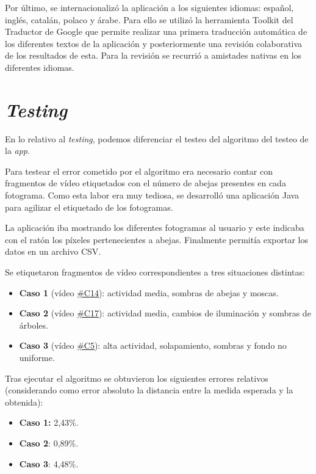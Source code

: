 Por último, se internacionalizó la aplicación a los siguientes idiomas:
español, inglés, catalán, polaco y árabe. Para ello se utilizó la
herramienta Toolkit del Traductor de Google que permite realizar una
primera traducción automática de los diferentes textos de la aplicación
y posteriormente una revisión colaborativa de los resultados de esta.
Para la revisión se recurrió a amistades nativas en los diferentes
idiomas.

\section{\emph{Testing}}\label{testing}

En lo relativo al \emph{testing}, podemos diferenciar el testeo del
algoritmo del testeo de la \emph{app}.

Para testear el error cometido por el algoritmo era necesario contar con
fragmentos de vídeo etiquetados con el número de abejas presentes en
cada fotograma. Como esta labor era muy tediosa, se desarrolló una
aplicación Java para agilizar el etiquetado de los fotogramas.

La aplicación iba mostrando los diferentes fotogramas al usuario y este
indicaba con el ratón los píxeles pertenecientes a abejas. Finalmente
permitía exportar los datos en un archivo CSV.


Se etiquetaron fragmentos de vídeo correspondientes a tres situaciones
distintas:

\begin{itemize}
\tightlist
\item
  \textbf{Caso 1} (vídeo \href{https://youtu.be/9pkPCnS2aRY}{\#C14}):
  actividad media, sombras de abejas y moscas.
\item
  \textbf{Caso 2} (vídeo \href{https://youtu.be/ENocXS3cEP0}{\#C17}):
  actividad media, cambios de iluminación y sombras de árboles.
\item
  \textbf{Caso 3} (vídeo \href{https://youtu.be/YjGX4mC7pO4}{\#C5}):
  alta actividad, solapamiento, sombras y fondo no uniforme.
\end{itemize}

Tras ejecutar el algoritmo se obtuvieron los siguientes errores
relativos (considerando como error absoluto la distancia entre la medida
esperada y la obtenida):

\begin{itemize}
\tightlist
\item
  \textbf{Caso 1:} 2,43\%.
\item
  \textbf{Caso 2}: 0,89\%.
\item
  \textbf{Caso 3}: 4,48\%.
\end{itemize}

